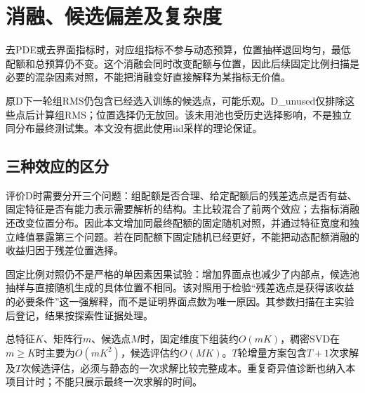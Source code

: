 \section{消融、候选偏差及复杂度}
去PDE或去界面指标时，对应组指标不参与动态预算，位置抽样退回均匀，最低配额和总预算仍不变。这个消融会同时改变配额与位置，因此后续固定比例扫描是必要的混杂因素对照，不能把消融变好直接解释为某指标无价值。

原D下一轮组RMS仍包含已经选入训练的候选点，可能乐观。D\_unused仅排除这些点后计算组RMS；位置选择仍无放回。该未用池也受历史选择影响，不是独立同分布最终测试集。本文没有据此使用iid采样的理论保证。

\subsection{三种效应的区分}
评价D时需要分开三个问题：组配额是否合理、给定配额后的残差选点是否有益、固定特征是否有能力表示需要解析的结构。主比较混合了前两个效应；去指标消融还改变位置分布。因此本文增加同最终配额的固定随机对照，并通过特征宽度和独立峰值暴露第三个问题。若在同配额下固定随机已经更好，不能把动态配额消融的收益归因于残差位置选择。

固定比例对照仍不是严格的单因素因果试验：增加界面点也减少了内部点，候选池抽样与直接随机生成的具体位置不相同。该对照用于检验“残差选点是获得该收益的必要条件”这一强解释，而不是证明界面点数为唯一原因。其参数扫描在主实验后登记，结果按探索性证据处理。

总特征$K$、矩阵行$m$、候选点$M$时，固定维度下组装约$O(mK)$，稠密SVD在$m\ge K$时主要为$O(mK^2)$，候选评估约$O(MK)$。$T$轮增量方案包含$T+1$次求解及$T$次候选评估，必须与静态的一次求解比较完整成本。重复奇异值诊断也纳入本项目计时；不能只展示最终一次求解的时间。



